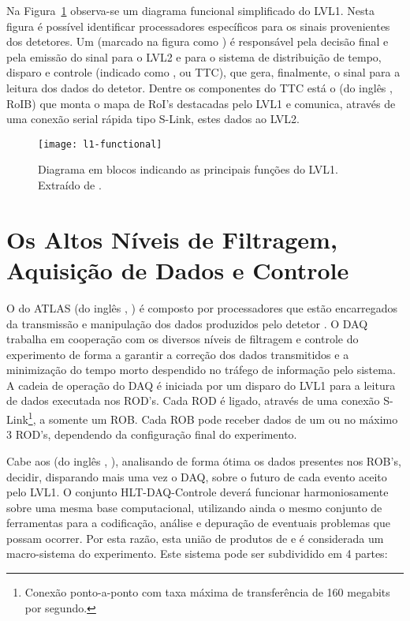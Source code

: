 Na Figura~\ref{fig:l1-functional} observa-se um diagrama funcional
simplificado do LVL1. Nesta figura é possível identificar processadores
específicos para os sinais provenientes dos detetores. Um  (marcado na figura como ) é responsável pela decisão final e pela emissão do sinal para o
LVL2 e para o sistema de distribuição de tempo, disparo e controle (indicado
como , ou TTC), que gera,
finalmente, o sinal para a leitura dos dados do detetor. Dentre os componentes
do TTC está o  (do inglês , RoIB)
que monta o mapa de RoI's destacadas pelo LVL1 e comunica, através de uma
conexão serial rápida tipo S-Link, estes dados ao LVL2.

\begin{figure}
\begin{center}
\texttt{[image: l1-functional]}
\end{center}
\caption[Diagrama em blocos indicando as principais funções do LVL1.]{Diagrama
em blocos indicando as principais funções do LVL1. Extraído de \cite{hlt-tdr}.}
\label{fig:l1-functional}
\end{figure}

\section{Os Altos Níveis de Filtragem, Aquisição de Dados e Controle}
\label{sec:hlt-daq}


O  do ATLAS (do inglês , ) é composto por processadores que estão
encarregados da transmissão e manipulação dos dados produzidos pelo detetor
\cite{hlt-tdr}. O DAQ trabalha em cooperação com os diversos níveis de
filtragem e controle do experimento de forma a garantir a correção dos dados
transmitidos e a minimização do tempo morto despendido no tráfego de
informação pelo sistema. A cadeia de operação do DAQ é iniciada por um disparo
do LVL1 para a leitura de dados executada nos ROD's. Cada ROD é ligado,
através de uma conexão S-Link\footnote{Conexão ponto-a-ponto com taxa máxima
de transferência de 160 megabits por segundo.}, a somente um ROB. Cada ROB
pode receber dados de um ou no máximo 3 ROD's, dependendo da configuração
final do experimento.

Cabe aos  (do inglês , ), analisando de forma ótima os dados presentes nos ROB's,
decidir, disparando mais uma vez o DAQ, sobre o futuro de cada evento aceito
pelo LVL1. O conjunto HLT-DAQ-Controle deverá funcionar harmoniosamente sobre
uma mesma base computacional, utilizando ainda o mesmo conjunto de ferramentas
para a codificação, análise e depuração de eventuais problemas que possam
ocorrer. Por esta razão, esta união de produtos de  e
 é considerada um macro-sistema do experimento. Este sistema
pode ser subdividido em 4 partes:

